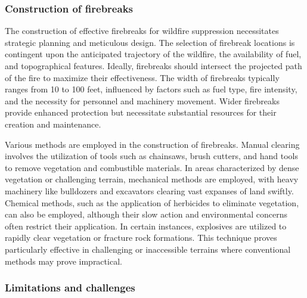 \documentclass[
  12 pt,
]{Nemilov}
\begin{document}
\subsubsection{Construction of firebreaks}\label{construction-of-firebreaks}

The construction of effective firebreaks for wildfire suppression necessitates strategic planning and meticulous design. The selection of firebreak locations is contingent upon the anticipated trajectory of the wildfire, the availability of fuel, and topographical features. Ideally, firebreaks should intersect the projected path of the fire to maximize their effectiveness. The width of firebreaks typically ranges from 10 to 100 feet, influenced by factors such as fuel type, fire intensity, and the necessity for personnel and machinery movement. Wider firebreaks provide enhanced protection but necessitate substantial resources for their creation and maintenance.

Various methods are employed in the construction of firebreaks. Manual clearing involves the utilization of tools such as chainsaws, brush cutters, and hand tools to remove vegetation and combustible materials. In areas characterized by dense vegetation or challenging terrain, mechanical methods are employed, with heavy machinery like bulldozers and excavators clearing vast expanses of land swiftly. Chemical methods, such as the application of herbicides to eliminate vegetation, can also be employed, although their slow action and environmental concerns often restrict their application. In certain instances, explosives are utilized to rapidly clear vegetation or fracture rock formations. This technique proves particularly effective in challenging or inaccessible terrains where conventional methods may prove impractical.

\subsubsection{Limitations and challenges}\label{limitations-and-challenges}
\end{document}
